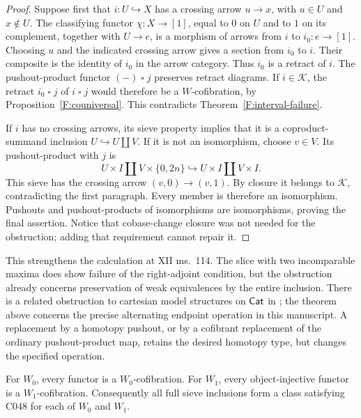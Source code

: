 \begin{proof}
Suppose first that $i:U\hookrightarrow X$ has a crossing
arrow $u\to x$, with $u\in U$ and $x\notin U$. The
classifying functor $\chi:X\to[1]$, equal to $0$ on $U$
and to $1$ on its complement, together with $U\to e$,
is a morphism of arrows from $i$ to $i_0:e\to[1]$.
Choosing $u$ and the indicated crossing arrow gives a
section from $i_0$ to $i$. Their composite is the identity
of $i_0$ in the arrow category. Thus $i_0$ is a retract
of $i$. The pushout-product functor $(-)\mathbin{\square}j$
preserves retract diagrams. If $i\in\mathcal K$, the
retract $i_0\mathbin{\square}j$ of
$i\mathbin{\square}j$ would therefore be a
$W$-cofibration, by Proposition~\ref{F:couniversal}.
This contradicts Theorem~\ref{F:interval-failure}.

If $i$ has no crossing arrows, its sieve property implies
that it is a coproduct-summand inclusion
$U\hookrightarrow U\amalg V$. If it is not an
isomorphism, choose $v\in V$. Its pushout-product with
$j$ is
\[
 U\times I\amalg V\times\{0,2n\}
       \hookrightarrow U\times I\amalg V\times I.
\]
This sieve has the crossing arrow $(v,0)\to(v,1)$.
By closure it belongs to $\mathcal K$, contradicting
the first paragraph. Every member is therefore an
isomorphism. Pushouts and pushout-products of
isomorphisms are isomorphisms, proving the final assertion.
Notice that cobase-change closure was not needed for the
obstruction; adding that requirement cannot repair it.
\end{proof}

This strengthens the calculation at XII ms.~114. The
slice with two incomparable maxima does show failure
of the right-adjoint condition, but the obstruction
already concerns preservation of weak equivalences by
the entire inclusion. There is a related obstruction
to cartesian model structures on $\mathsf{Cat}$ in
\citet[Propositions~4.1--4.3]{F_Pavlov2024}; the theorem
above concerns the precise alternating endpoint
operation in this manuscript. A replacement by a
homotopy pushout, or by a cofibrant replacement of the
ordinary pushout-product map, retains the desired
homotopy type, but changes the specified operation.

\begin{proposition}
\label{F:W0}
For $W_0$, every functor is a $W_0$-cofibration.
For $W_1$, every object-injective functor is a
$W_1$-cofibration. Consequently all full sieve
inclusions form a class satisfying C048 for each
of $W_0$ and $W_1$.
\end{proposition}

